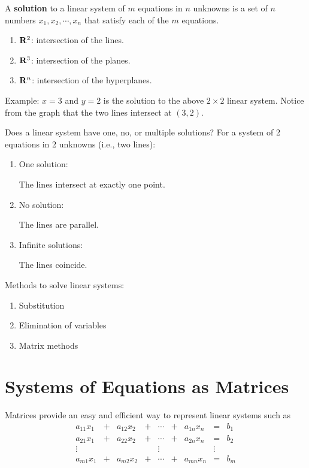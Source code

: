 \documentclass[]{book}
\providecommand{\tightlist}{%
  \setlength{\itemsep}{0pt}\setlength{\parskip}{0pt}}
\theoremstyle{definition}
\theoremstyle{definition}
\theoremstyle{definition}
\theoremstyle{remark}
\begin{document}
A \textbf{solution} to a linear system of \(m\) equations in \(n\)
unknowns is a set of \(n\) numbers \(x_1, x_2, \cdots, x_n\) that
satisfy each of the \(m\) equations.

\begin{enumerate} 
        \item ${\bf R}^2$: intersection of the lines. 
        \item ${\bf R}^3$: intersection of the planes.
        \item ${\bf R}^n$: intersection of the hyperplanes.
    \end{enumerate}

Example: \(x=3\) and \(y=2\) is the solution to the above \(2\times 2\)
linear system. Notice from the graph that the two lines intersect at
\((3,2)\).

Does a linear system have one, no, or multiple solutions? For a system
of 2 equations in 2 unknowns (i.e., two lines):

\begin{enumerate}
        \item \parbox[t]{1.5in}{One solution:} The lines intersect at exactly one point.
        \item \parbox[t]{1.5in}{No solution:}  The lines are parallel.
        \item \parbox[t]{1.5in}{Infinite solutions:} The lines coincide.
\end{enumerate}

Methods to solve linear systems:

\begin{enumerate}
\def\labelenumi{\arabic{enumi}.}
\tightlist
\item
  Substitution
\item
  Elimination of variables
\item
  Matrix methods
\end{enumerate}

\section{Systems of Equations as
Matrices}\label{systems-of-equations-as-matrices}

Matrices provide an easy and efficient way to represent linear systems
such as \[\begin{matrix}
        a_{11}x_1  & + & a_{12}x_2 & + & \cdots & + & a_{1n}x_n & = & b_1\\
        a_{21}x_1  & + & a_{22}x_2 & + & \cdots & + & a_{2n}x_n & = & b_2\\
        \vdots     &   &     &   & \vdots &   &     & \vdots & \\
        a_{m1}x_1  & + & a_{m2}x_2 & + & \cdots & + & a_{mn}x_n & = & b_m
        \end{matrix}\]
\end{document}
